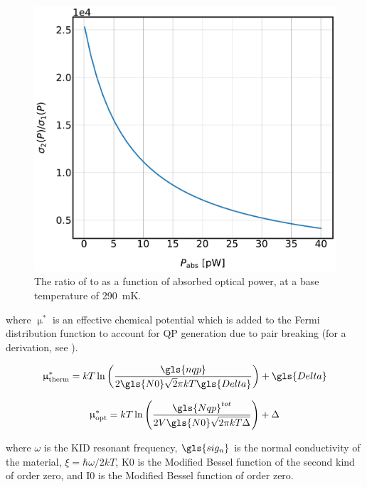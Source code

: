 \begin{figure}[!htbp]
\centering
\includegraphics[width=\textwidth]{figures/kid_model/sig_ratio_P}
\caption[The ratio of  to  as a function of absorbed optical power at a base temperature of 290~mK.]{The ratio of  to  as a function of absorbed optical power, at a base temperature of 290~mK.}
\label{fig:sig_ratio_P}
\end{figure}

where $\upmu^{*}$ is an effective chemical potential which is added to the Fermi distribution function to account for QP generation due to pair breaking (for a derivation, see \citet{PhysRevLett.28.1559,gao2008physics}).

\begin{equation}
  \upmu^{*}_{\mathrm{therm}} = kT\ln\left( \frac{\gls{nqp}}{2\gls{N0}\sqrt 2\pi kT\gls{Delta}} \right) + \gls{Delta}
\end{equation}

\begin{equation}
  \upmu^{*}_{\mathrm{opt}} = kT\ln \left( \frac{\gls{Nqp}^{tot}}{2V\gls{N0}\sqrt{2\pi kT\Delta}} \right) + \Delta
\end{equation}

where $\omega$ is the KID resonant frequency, $\gls{sig_n}$ is the normal conductivity of the material, $\xi = \hbar \omega/2kT$, \gls{K0} is the Modified Bessel function of the second kind of order zero, and \gls{I0} is the Modified Bessel function of order zero.


